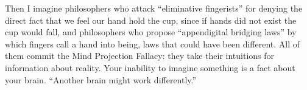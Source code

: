 Then I imagine philosophers who attack ``eliminative fingerists'' for denying the direct fact that we feel our hand hold the cup, since if hands did not exist the cup would fall, and philosophers who propose ``appendigital bridging laws'' by which fingers call a hand into being, laws that could have been different. All of them commit the Mind Projection Fallacy: they take their intuitions for information about reality.  Your inability to imagine something is a fact about your brain. ``Another brain might work differently.''
